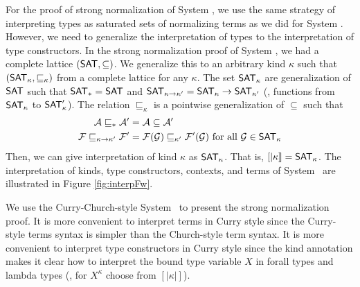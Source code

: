 For the proof of strong normalization of System \Fw, we use the same strategy
of interpreting types as saturated sets of normalizing terms as we did for
System \F. However, we need to generalize the interpretation of types to
the interpretation of type constructors. In the strong normalization proof
of System \F, we had a complete lattice $(\mathsf{SAT},\subseteq)$.
We generalize this to an arbitrary kind $\kappa$ such that
$(\mathsf{SAT}_\kappa,\sqsubseteq_\kappa)$ from a complete lattice for any $\kappa$.
The set $\mathsf{SAT}_\kappa$ are generalization of $\mathsf{SAT}$ such that $\mathsf{SAT}_{*}=\mathsf{SAT}$
and $\mathsf{SAT}_{\kappa -> \kappa'} = \mathsf{SAT}_\kappa -> \mathsf{SAT}_{\kappa'}$
(\ie, functions from $\mathsf{SAT}_\kappa$ to $\mathsf{SAT}_\kappa'$).
The relation $\sqsubseteq_\kappa$ is a pointwise generalization of $\subseteq$
such that
\begin{align*}
\mathcal{A} \sqsubseteq_{*} \mathcal{A'} &= \mathcal{A} \subseteq \mathcal{A'}\\
\mathcal{F} \sqsubseteq_{\kappa -> \kappa'} \mathcal{F'} &=
	\mathcal{F}(\mathcal{G}) \sqsubseteq_{\kappa'} \mathcal{F'}(\mathcal{G})
	~\text{for all}~\mathcal{G}\in\mathsf{SAT}_\kappa
\end{align*}
Then, we can give interpretation of kind $\kappa$ as $\mathsf{SAT}_\kappa$.
That is, $[| \kappa |] = \mathsf{SAT}_\kappa$.
The interpretation of kinds, type constructors, contexts, and
terms of System \Fw\ are illustrated in Figure \ref{fig:interpFw}. 

We use the Curry-Church-style System \Fw\ to present the strong normalization
proof. It is more convenient to interpret terms in Curry style since
the Curry-style terms syntax is simpler than the Church-style term syntax.
It is more convenient to interpret type constructors in Curry style since
the kind annotation makes it clear how to interpret the bound type variable $X$
in forall types and lambda types (\ie, for $X^\kappa$ choose from $[|\kappa|]$).

